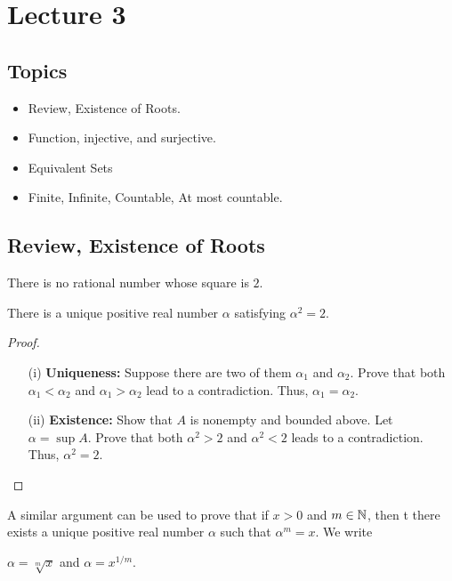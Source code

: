 \documentclass[a4paper]{report}
\begin{document}
\section{Lecture 3}

\subsection{Topics}

\begin{itemize}
    \item Review, Existence of Roots.
    \item Function, injective, and surjective.
    \item Equivalent Sets
    \item Finite, Infinite, Countable, At most countable.
\end{itemize}

\subsection{Review, Existence of Roots}

\begin{prop}
   There is no rational number whose square is \( 2 \). 
\end{prop}

\begin{theorem}[ ]
    There is a unique positive real number \( \alpha  \) satisfying \( \alpha^{2} = 2  \). 
\end{theorem}

\begin{proof}
\begin{enumerate}
    \item[(i)] \textbf{Uniqueness:} Suppose there are two of them \( {\alpha}_{1} \) and \( {\alpha}_{2} \). Prove that both \( {\alpha}_{1} < {\alpha}_{2} \) and \( {\alpha}_{1} > {\alpha}_{2} \) lead to a contradiction. Thus, \( {\alpha}_{1} = {\alpha}_{2} \). 
    \item[(ii)] \textbf{Existence:} Show that \( A  \) is nonempty and bounded above. Let \( \alpha = \sup A  \). Prove that both \( \alpha^{2} > 2  \) and \( \alpha^{2} < 2  \) leads to a contradiction. Thus, \( \alpha^{2} = 2  \).
\end{enumerate}
\end{proof}

\begin{remark}
    A similar argument can be used to prove that if \( x > 0  \) and \( m \in \mathbb{N}  \), then t there exists a unique positive real number \( \alpha  \) such that \( \alpha^{m} = x  \). We write
    \begin{center}
        \( \alpha = \sqrt[m]{ x } \) and \( \alpha = x^{1/m} \).
    \end{center}
\end{remark}
\end{document}
